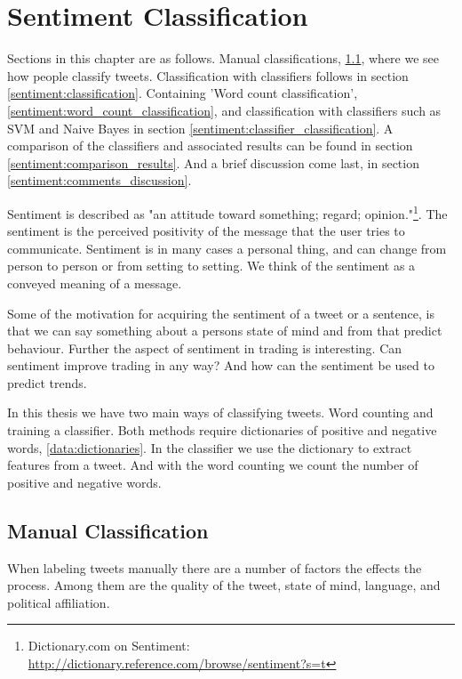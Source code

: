 \chapter{Sentiment Classification}\label{sentiment}

Sections in this chapter are as follows. Manual classifications,
\ref{sentiment:manual_classification}, where we see how people classify
tweets. Classification with classifiers follows in section
\ref{sentiment:classification}. Containing 'Word count classification',
\ref{sentiment:word_count_classification}, and classification with classifiers
such as SVM and Naive Bayes in section
\ref{sentiment:classifier_classification}. A comparison of the classifiers and
associated results can be found in section \ref{sentiment:comparison_results}.
And a brief discussion come last, in section
\ref{sentiment:comments_discussion}. 

Sentiment is described as "an attitude toward something; regard;
opinion."\footnote{ Dictionary.com on Sentiment:
\url{http://dictionary.reference.com/browse/sentiment?s=t}}. The sentiment is the perceived positivity of the message that the user tries to
communicate. Sentiment is in many cases a personal thing, and can change from
person to person or from setting to setting. We think of the sentiment as a
conveyed meaning of a message. 

Some of the motivation for acquiring the sentiment of a tweet or a sentence, is
that we can say something about a persons state of mind and from that predict
behaviour. Further the aspect of sentiment in trading is interesting. Can
sentiment improve trading in any way? And how can the sentiment be used to
predict trends.

In this thesis we have two main ways of classifying tweets. Word counting and
training a classifier. Both methods require dictionaries of positive and
negative words, \ref{data:dictionaries}. In the classifier we use the dictionary
to extract features from a tweet. And with the word counting we count the
number of positive and negative words. 

\section{Manual Classification}\label{sentiment:manual_classification}
When labeling tweets manually there are a number of factors the effects the
process. Among them are the quality of the tweet, state of mind, language, and
political affiliation.

